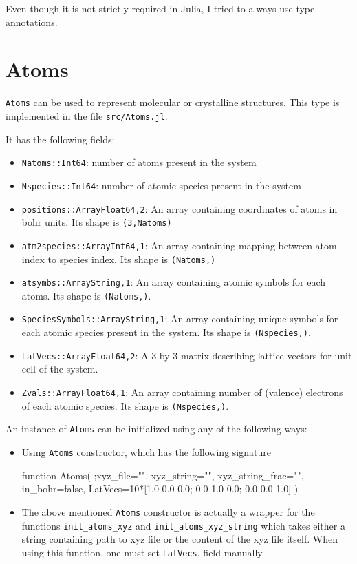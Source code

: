 \documentclass[a4paper,10pt]{paper}
\newcommand{\jlcode}[1]{\texttt{#1}}
\begin{document}
Even though it is not strictly required in Julia, I tried to always use type annotations.

\section{Atoms}

\texttt{Atoms} can be used to represent molecular or crystalline structures.
This type is implemented in the file \texttt{src/Atoms.jl}.

It has the following fields:
\begin{itemize}
%
\item \jlcode{Natoms::Int64}: number of atoms present in the system
%
\item \jlcode{Nspecies::Int64}: number of atomic species present in the system
%
\item \jlcode{positions::Array{Float64,2}}: An array containing coordinates of atoms
  in bohr units. Its shape is \jlcode{(3,Natoms)}
%
\item \jlcode{atm2species::Array{Int64,1}}: An array containing mapping between atom index
  to species index. Its shape is \jlcode{(Natoms,)}
%
\item \jlcode{atsymbs::Array{String,1}}: An array containing atomic symbols for each atoms.
  Its shape is \jlcode{(Natoms,)}.
%
\item \jlcode{SpeciesSymbols::Array{String,1}}: An array containing unique symbols
  for each atomic species present in the system. Its shape is \jlcode{(Nspecies,)}.
%
\item \jlcode{LatVecs::Array{Float64,2}}: A 3 by 3 matrix describing lattice vectors for unit
  cell of the system.
%
\item \jlcode{Zvals::Array{Float64,1}}: An array containing number of (valence)
  electrons of each atomic species. Its shape is \verb|(Nspecies,)|.
\end{itemize}

An instance of \jlcode{Atoms} can be initialized using any of the following ways:

\begin{itemize}
\item Using \jlcode{Atoms} constructor, which has the following signature
%
\begin{juliacode}
function Atoms( ;xyz_file="", xyz_string="", xyz_string_frac="",
                in_bohr=false,
                LatVecs=10*[1.0 0.0 0.0; 0.0 1.0 0.0; 0.0 0.0 1.0] )
\end{juliacode}
%
\item The above mentioned \jlcode{Atoms} constructor is actually a wrapper for the functions
  \jlcode{init_atoms_xyz} and \jlcode{init_atoms_xyz_string} which takes either
  a string containing path to xyz file or the content of the xyz file
  itself. When using this function, one must set \jlcode{LatVecs}.
  field manually.
\end{itemize}
\end{document}
